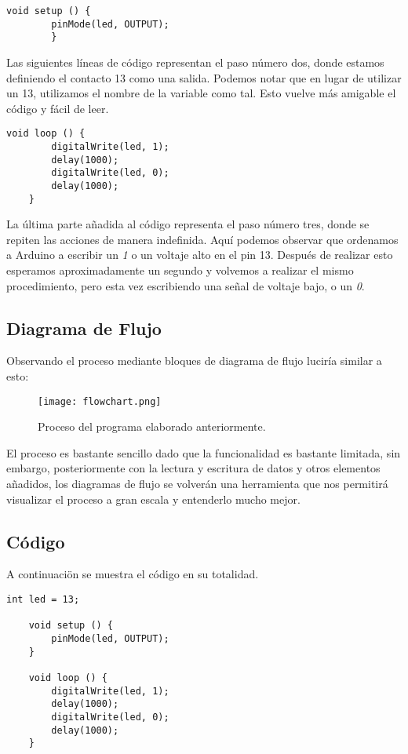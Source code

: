 \documentclass[12pt, letterpaper]{article}
\begin{document}
\begin{lstlisting}[language=Arduino]
	void setup () {
		pinMode(led, OUTPUT);
		}
\end{lstlisting}

Las siguientes líneas de código representan el paso número dos, donde estamos definiendo el contacto 13 como una salida. Podemos notar que en lugar de utilizar un 13, utilizamos el nombre de la variable como tal. Esto vuelve más amigable el código y fácil de leer.


\begin{lstlisting}[language=Arduino]
	void loop () {
		digitalWrite(led, 1);
		delay(1000);
		digitalWrite(led, 0);
		delay(1000);
	}
\end{lstlisting}

La última parte añadida al código representa el paso número tres, donde se repiten las acciones de manera indefinida. Aquí podemos observar que ordenamos a Arduino a escribir un \textit{1} o un voltaje alto en el pin 13. Después de realizar esto esperamos aproximadamente un segundo y volvemos a realizar el mismo procedimiento, pero esta vez escribiendo una señal de voltaje bajo, o un \textit{0}.

\subsection*{Diagrama de Flujo}
Observando el proceso mediante bloques de diagrama de flujo luciría similar a esto:

\begin{figure}[H]
	\centering
	\texttt{[image: flowchart.png]}
	\caption{Proceso del programa elaborado anteriormente.}
\end{figure}

El proceso es bastante sencillo dado que la funcionalidad es bastante limitada, sin embargo, posteriormente con la lectura y escritura de datos y otros elementos añadidos, los diagramas de flujo se volverán una herramienta que nos permitirá visualizar el proceso a gran escala y entenderlo mucho mejor.

\subsection*{Código}
A continuaciön se muestra el código en su totalidad.

\begin{lstlisting}[language=Arduino]
	int led = 13;
	
	void setup () {
		pinMode(led, OUTPUT);
	}

	void loop () {
		digitalWrite(led, 1);
		delay(1000);
		digitalWrite(led, 0);
		delay(1000);
	}
\end{lstlisting}
\end{document}
